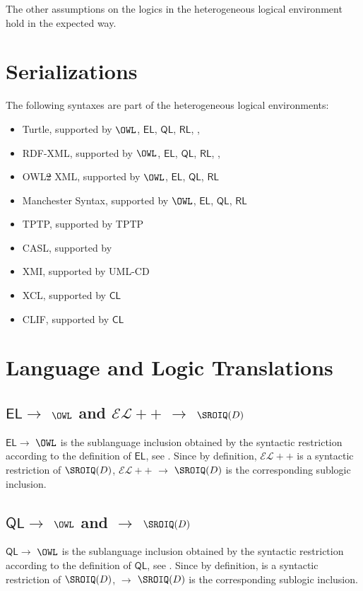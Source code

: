 \documentclass[10pt,fleqn,final]{scrreprt}
\newcommand*{\CL}{\ensuremath{\mathsf{CL}}\xspace}
\newcommand{\QL}{\ensuremath{\mathsf{QL}}\xspace}
\newcommand{\RL}{\ensuremath{\mathsf{RL}}\xspace}
\newcommand{\EL}{\ensuremath{\mathsf{EL}}\xspace}
\newcommand{\ELDL}{\ensuremath{\mathcal{EL}}\xspace}
\newcommand{\noterefname}{note}
\newcommand{\nref}[1]{\noterefname~\ref{#1}}
\newcommand{\sclause}[1]{\section{#1}}
\newcommand{\ssclause}[1]{\subsection{#1}}
\renewcommand{\nref}[1]{\ref{nref-#1}} %
\newenvironment{definitions}[0]{\medskip }{}
\providecommand{\DIFadd}[1]{{\protect\color{blue}\uwave{#1}}} %
\providecommand{\DIFdel}[1]{{\protect\color{red}\sout{#1}}}                      %
\providecommand{\DIFaddbegin}{} %
\providecommand{\DIFaddend}{} %
\providecommand{\DIFdelbegin}{} %
\providecommand{\DIFdelend}{} %
\begin{document}
\begin{definitions}
The other assumptions on the logics in the heterogeneous logical environment hold in
the expected way.\DIFdelbegin %
\DIFdelend \DIFaddbegin {}
\DIFaddend 

\sclause{Serializations}

The following syntaxes are part of the heterogeneous logical environments:
\begin{itemize}
 \item Turtle, supported by $\OWL$, \EL, \QL, \RL , \RDF, \RDFS
 \item RDF-XML, supported by $\OWL$, \EL, \QL, \RL , \RDF, \RDFS
 \item OWL\DIFdelbegin \DIFdel{2 }\DIFdelend \DIFaddbegin \DIFadd{/}\DIFaddend XML, supported by $\OWL$, \EL, \QL, \RL 
 \item Manchester Syntax, supported by $\OWL$, \EL, \QL, \RL
  \item TPTP, supported by TPTP
  \item CASL, supported by \CASL
 \item XMI, supported by UML\mbox{-}CD
 \item XCL, supported by \CL
 \item CLIF, supported by \CL 
\end{itemize}

\sclause{Language and Logic Translations}

\ssclause{\EL $\to$ $\OWL$ and $\ELDL{+}{+}$ $\to$ $\SROIQ(D)$}

\EL $\to$ $\OWL$ is the sublanguage inclusion obtained by the
syntactic restriction according to the definition of \EL, see
\DIFdelbegin %
\DIFdelend \DIFaddbegin \DIFadd{\nref{OWL2-profiles}}\DIFaddend . Since by definition, $\ELDL{+}{+}$
is a syntactic restriction of $\SROIQ(D)$, $\ELDL{+}{+}$ $\to$ $\SROIQ(D)$
is the corresponding sublogic inclusion.

\ssclause{\QL $\to$ $\OWL$ and \DLLiteR $\to$ $\SROIQ(D)$}

\QL $\to$ $\OWL$ is the sublanguage inclusion obtained by the
syntactic restriction according to the definition of \QL, see
\DIFdelbegin %
\DIFdelend \DIFaddbegin \DIFadd{\nref{OWL2-profiles}}\DIFaddend . Since by definition, \DLLiteR
is a syntactic restriction of $\SROIQ(D)$, \DLLiteR $\to$ $\SROIQ(D)$
is the corresponding sublogic inclusion.


\end{definitions}
\end{document}
